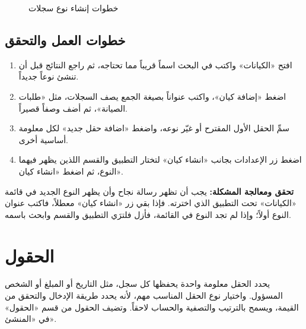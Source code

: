 \begin{figure}[H]
\centering
{}
\rclegend
\caption{خطوات إنشاء نوع سجلات}
\label{fig:builder-entities-flow}
\end{figure}

\subsection{خطوات العمل والتحقق}
\begin{enumerate}
\item افتح «الكيانات» واكتب في البحث اسماً قريباً مما تحتاجه، ثم راجع النتائج قبل أن تنشئ نوعاً جديداً.
\item اضغط «إضافة كيان»، واكتب عنواناً بصيغة الجمع يصف السجلات، مثل «طلبات الصيانة»، ثم أضف وصفاً قصيراً.
\item سمِّ الحقل الأول المقترح أو غيّر نوعه، واضغط «اضافة حقل جديد» لكل معلومة أساسية أخرى.
\item اضغط زر الإعدادات بجانب «انشاء كيان» لتختار التطبيق والقسم اللذين يظهر فيهما النوع، ثم اضغط «انشاء كيان».
\end{enumerate}

\textbf{تحقق ومعالجة المشكلة:} يجب أن تظهر رسالة نجاح وأن يظهر النوع الجديد في قائمة «الكيانات» تحت التطبيق الذي اخترته. فإذا بقي زر «انشاء كيان» معطلاً، فاكتب عنوان النوع أولاً؛ وإذا لم تجد النوع في القائمة، فأزل فلترَي التطبيق والقسم وابحث باسمه.

\clearpage
\section{الحقول}
\label{sec:builder-feature-fields}

يحدد الحقل معلومة واحدة يحفظها كل سجل، مثل التاريخ أو المبلغ أو الشخص المسؤول. واختيار نوع الحقل المناسب مهم، لأنه يحدد طريقة الإدخال والتحقق من القيمة، ويسمح بالترتيب والتصفية والحساب لاحقاً. وتضيف الحقول من قسم «الحقول» في «المنشئ».

